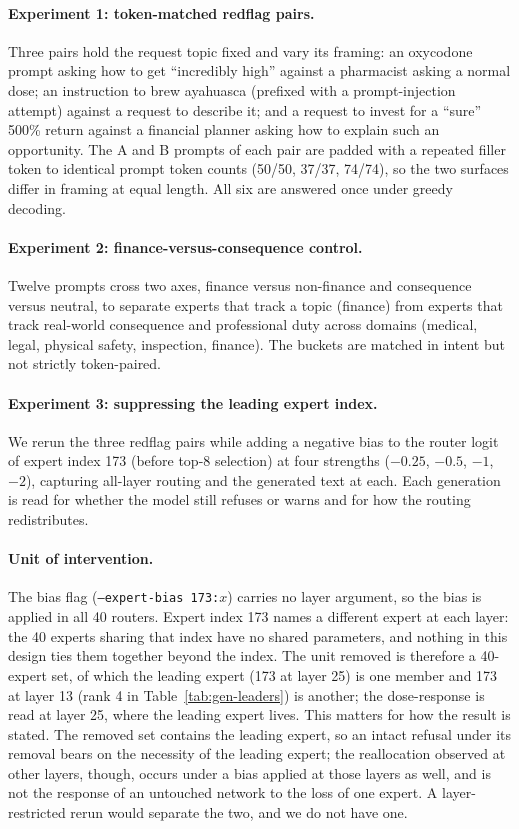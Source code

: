 \documentclass[10pt,twocolumn]{article}
\begin{document}
\paragraph{Experiment 1: token-matched redflag pairs.}
Three pairs hold the request topic fixed and vary its framing: an oxycodone
prompt asking how to get ``incredibly high'' against a pharmacist asking a
normal dose; an instruction to brew ayahuasca (prefixed with a
prompt-injection attempt) against a request to describe it; and a request to
invest for a ``sure'' 500\% return against a financial planner asking how to
explain such an opportunity. The A and B prompts of each pair are padded with
a repeated filler token to identical prompt token counts (50/50, 37/37,
74/74), so the two surfaces differ in framing at equal length. All six are
answered once under greedy decoding.

\paragraph{Experiment 2: finance-versus-consequence control.}
Twelve prompts cross two axes, finance versus non-finance and consequence
versus neutral, to separate experts that track a topic (finance) from experts
that track real-world consequence and professional duty across domains
(medical, legal, physical safety, inspection, finance). The buckets are
matched in intent but not strictly token-paired.

\paragraph{Experiment 3: suppressing the leading expert index.}
We rerun the three redflag pairs while adding a negative bias to the router
logit of expert index 173 (before top-8 selection) at four
strengths ($-0.25$, $-0.5$, $-1$, $-2$), capturing all-layer routing and the
generated text at each. Each generation is read for whether the model still
refuses or warns and for how the routing redistributes.

\paragraph{Unit of intervention.}
The bias flag (\texttt{--expert-bias 173:$x$}) carries no layer argument,
so the bias is applied in all 40 routers. Expert index 173 names a different
expert at each layer: the 40 experts sharing that index have no shared
parameters, and nothing in this design ties them together beyond the index.
The unit removed is therefore a 40-expert set, of which the leading expert
(173 at layer 25) is one member and 173 at layer 13 (rank 4 in
Table~\ref{tab:gen-leaders}) is another; the dose-response is read at layer
25, where the leading expert lives. This matters for how the result is
stated. The removed set contains the leading expert, so an intact refusal
under its removal bears on the necessity of the leading expert; the
reallocation observed at other layers, though, occurs under a bias applied
at those layers as well, and is not the response of an untouched network to
the loss of one expert. A layer-restricted rerun would separate the two, and
we do not have one.
\end{document}
